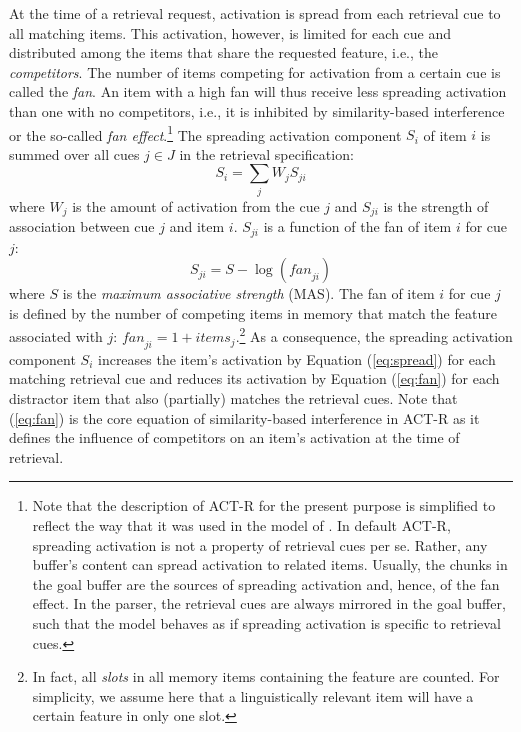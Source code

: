\documentclass{cambridge7A}\usepackage[]{graphicx}\usepackage[]{color}
\begin{document}
At the time of a retrieval request, activation is spread from each retrieval cue to all matching items. This activation, however, is limited for each cue and distributed among the items that share the requested feature, i.e., the \emph{competitors}. The number of items competing for activation from a certain cue is called the \textit{fan}. An item with a high fan will thus receive less spreading activation than one with no competitors, i.e., it is inhibited by similarity-based interference or the so-called \textit{fan effect}.\footnote{Note that the description of ACT-R for the present purpose is simplified to reflect the way that it was used in the model of \cite{LewisVasishth2005}. In default ACT-R, spreading activation is not a property of retrieval cues per se. Rather, any buffer's content can spread activation to related items. Usually, the chunks in the goal buffer are the sources of spreading activation and, hence, of the fan effect. In the \cite{LewisVasishth2005} parser, the retrieval cues are always mirrored in the goal buffer, such that the model behaves as if spreading activation is specific to retrieval cues.}
The spreading activation component $S_i$ of item $i$ is summed over all cues $j \in J$ in the retrieval specification: 
\begin{equation}\label{eq:spread}
	S_i = \sum_j W_{j} S_{ji}
\end{equation}
where $W_{j}$ is the amount of activation from the cue $j$ and $S_{ji}$ is the strength of association between cue $j$ and item $i$. $S_{ji}$ is a function of the fan of item $i$ for cue $j$:%
\begin{equation}\label{eq:fan}
	S_{ji} = S - \log(\textit{fan}_{ji})
\end{equation}
where $S$ is the \textit{maximum associative strength} (MAS). The fan of item $i$ for cue $j$ is defined by the number of competing items in memory that match the feature associated with $j$: $\textit{fan}_{ji} = 1+\textit{items}_j$.\footnote{In fact, all \textit{slots} in all memory items containing the feature are counted. For simplicity, we assume here that a linguistically relevant item will have a certain feature in only one slot.}
As a consequence, the spreading activation component $S_i$ increases the item's activation by Equation (\ref{eq:spread}) for each matching retrieval cue and reduces its activation by Equation (\ref{eq:fan}) for each distractor item that also (partially) matches the retrieval cues. Note that (\ref{eq:fan}) is the core equation of similarity-based interference in ACT-R as it defines the influence of competitors on an item's activation at the time of retrieval.
\end{document}
